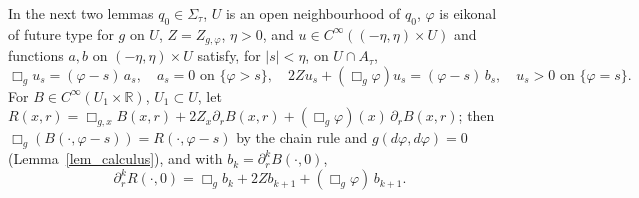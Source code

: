 \documentclass[11pt,a4paper,reqno]{amsart}
\theoremstyle{definition}
\numberwithin{equation}{section}
\newcommand{\R}{\mathbb{R}}
\begin{document}
In the next two lemmas $q_0\in\Sigma_\tau$, $U$ is an open neighbourhood of $q_0$, $\varphi$ is eikonal of future type for
$g$ on $U$, $Z=Z_{g,\varphi}$, $\eta>0$, and $u\in C^\infty((-\eta,\eta)\times U)$ and functions $a,b$ on
$(-\eta,\eta)\times U$ satisfy, for $|s|<\eta$, on $U\cap A_\tau$,
\begin{equation}\label{eq_ind_above}
\Box_gu_s=(\varphi-s)\,a_s,\quad a_s=0\text{ on }\{\varphi>s\},\quad 2Zu_s+(\Box_g\varphi)u_s=(\varphi-s)\,b_s,\quad
u_s>0\text{ on }\{\varphi=s\}.
\end{equation}
For $B\in C^\infty(U_1\times\R)$, $U_1\subset U$, let
$R(x,r)=\Box_{g,x}B(x,r)+2Z_x\partial_rB(x,r)+(\Box_g\varphi)(x)\,\partial_rB(x,r)$; then
$\Box_g(B(\cdot,\varphi-s))=R(\cdot,\varphi-s)$ by the chain rule and $g(d\varphi,d\varphi)=0$ (Lemma~\ref{lem_calculus}), and with $b_k=\partial_r^kB(\cdot,0)$,
\begin{equation}\label{eq_ind_hierarchy}
\partial_r^kR(\cdot,0)=\Box_gb_k+2Zb_{k+1}+(\Box_g\varphi)\,b_{k+1}.
\end{equation}
\end{document}
